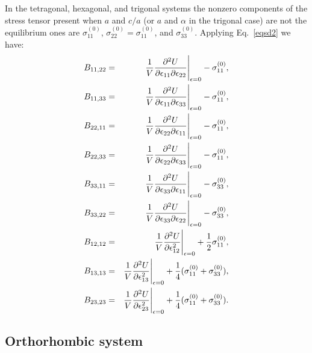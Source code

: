 \documentclass[12pt,a4paper,twoside]{report}
\begin{document}
In the tetragonal, hexagonal, and trigonal systems the nonzero components 
of the stress tensor present when $a$ and $c/a$ (or $a$ and $\alpha$ in
the trigonal case) are not the equilibrium ones are
$\sigma^{(0)}_{11}$, $\sigma^{(0)}_{22}=\sigma^{(0)}_{11}$, and
$\sigma^{(0)}_{33}$.
Applying Eq.~\ref{eqsd2} we have:
\begin{eqnarray}
B_{11,22} &=& {1 \over V}{\partial^2 U \over \partial \epsilon_{11} 
\partial \epsilon_{22}}\Bigg|_{\epsilon=0} - \sigma^{(0)}_{11}, \\
B_{11,33} &=& {1 \over V}{\partial^2 U \over \partial \epsilon_{11} 
\partial \epsilon_{33}}\Bigg|_{\epsilon=0} - \sigma^{(0)}_{11}, \\
B_{22,11} &=& {1 \over V}{\partial^2 U \over \partial \epsilon_{22} 
\partial \epsilon_{11}}\Bigg|_{\epsilon=0} - \sigma^{(0)}_{11}, \\
B_{22,33} &=& {1 \over V}{\partial^2 U \over \partial \epsilon_{22} 
\partial \epsilon_{33}}\Bigg|_{\epsilon=0} - \sigma^{(0)}_{11}, \\
B_{33,11} &=& {1 \over V}{\partial^2 U \over \partial \epsilon_{33} 
\partial \epsilon_{11}}\Bigg|_{\epsilon=0} - \sigma^{(0)}_{33}, \\
B_{33,22} &=& {1 \over V}{\partial^2 U \over \partial \epsilon_{33} 
\partial \epsilon_{22}}\Bigg|_{\epsilon=0} - \sigma^{(0)}_{33}, \\
B_{12,12} &=& {1 \over V}{\partial^2 U \over \partial \epsilon_{12}^2 }\Bigg|_{\epsilon=0} + {1\over 2} \sigma^{(0)}_{11}, \\
B_{13,13} &=& {1 \over V}{\partial^2 U \over \partial \epsilon_{13}^2}\Bigg|_{\epsilon=0} + {1\over 4} (\sigma^{(0)}_{11}+\sigma^{(0)}_{33}), \\
B_{23,23} &=& {1 \over V}{\partial^2 U \over \partial \epsilon_{23}^2 }\Bigg|_{\epsilon=0} + {1\over 4} (\sigma^{(0)}_{11}+\sigma^{(0)}_{33}).
\end{eqnarray}

{\color{web-blue}\subsection{Orthorhombic system}}
\color{black}
\end{document}
